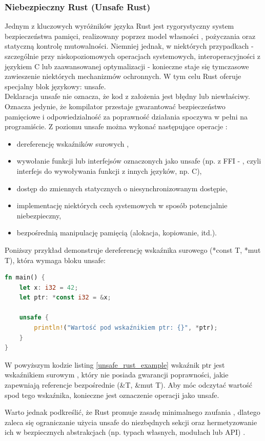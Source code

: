 \subsubsection{Niebezpieczny Rust (Unsafe Rust)}
Jednym z kluczowych wyróżników języka Rust jest rygorystyczny system bezpieczeństwa pamięci, realizowany poprzez model własności , pożyczania  oraz statyczną kontrolę mutowalności. Niemniej jednak, w niektórych przypadkach - szczególnie przy niskopoziomowych operacjach systemowych, interoperacyjności z językiem C lub zaawansowanej optymalizacji - konieczne staje się tymczasowe zawieszenie niektórych mechanizmów ochronnych. W tym celu Rust oferuje specjalny blok językowy: unsafe. \\
Deklaracja unsafe nie oznacza, że kod z założenia jest błędny lub niewłaściwy. Oznacza jedynie, że kompilator przestaje gwarantować bezpieczeństwo pamięciowe i odpowiedzialność za poprawność działania spoczywa w pełni na programiście. Z poziomu unsafe można wykonać następujące operacje \cite{UnsafeRust} :
\begin{itemize}
\item dereferencję wskaźników surowych ,
\item wywołanie funkcji lub interfejsów oznaczonych jako unsafe (np. z FFI - , czyli interfejs do wywoływania funkcji z innych języków, np. C),
\item dostęp do zmiennych statycznych o niesynchronizowanym dostępie,
\item implementację niektórych cech  systemowych w sposób potencjalnie niebezpieczny,
\item bezpośrednią manipulację pamięcią (alokacja, kopiowanie, itd.).
\end{itemize} 
Poniższy przykład demonstruje dereferencję wskaźnika surowego (*const T, *mut T), która wymaga bloku unsafe:
\begin{lstlisting}[language=Rust, caption=Przykład użycia unsafe Rust, label=unsafe_rust_example]
fn main() {
    let x: i32 = 42;
    let ptr: *const i32 = &x;

    unsafe {
        println!("Wartość pod wskaźnikiem ptr: {}", *ptr);
    }
}
\end{lstlisting}
W powyższym kodzie listing \ref{unsafe_rust_example} wskaźnik ptr jest wskaźnikiem surowym , który nie posiada gwarancji poprawności, jakie zapewniają referencje bezpośrednie (\&T, \&mut T). Aby móc odczytać wartość spod tego wskaźnika, konieczne jest oznaczenie operacji jako unsafe.

Warto jednak podkreślić, że Rust promuje zasadę minimalnego zaufania , dlatego zaleca się ograniczanie użycia unsafe do niezbędnych sekcji oraz hermetyzowanie ich w bezpiecznych abstrakcjach (np. typach własnych, modułach lub API) \cite{UnsafeRust}.





